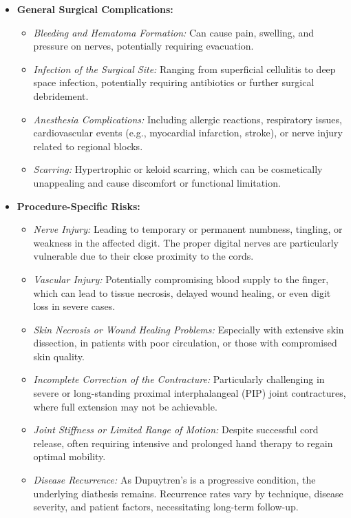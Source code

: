 \begin{itemize}
  \item \textbf{General Surgical Complications:}
  \begin{itemize}
    \item \textit{Bleeding and Hematoma Formation:} Can cause pain, swelling, and pressure on nerves, potentially requiring evacuation.
    \item \textit{Infection of the Surgical Site:} Ranging from superficial cellulitis to deep space infection, potentially requiring antibiotics or further surgical debridement.
    \item \textit{Anesthesia Complications:} Including allergic reactions, respiratory issues, cardiovascular events (e.g., myocardial infarction, stroke), or nerve injury related to regional blocks.
    \item \textit{Scarring:} Hypertrophic or keloid scarring, which can be cosmetically unappealing and cause discomfort or functional limitation.
  \end{itemize}
  \item \textbf{Procedure-Specific Risks:}
  \begin{itemize}
    \item \textit{Nerve Injury:} Leading to temporary or permanent numbness, tingling, or weakness in the affected digit. The proper digital nerves are particularly vulnerable due to their close proximity to the cords.
    \item \textit{Vascular Injury:} Potentially compromising blood supply to the finger, which can lead to tissue necrosis, delayed wound healing, or even digit loss in severe cases.
    \item \textit{Skin Necrosis or Wound Healing Problems:} Especially with extensive skin dissection, in patients with poor circulation, or those with compromised skin quality.
    \item \textit{Incomplete Correction of the Contracture:} Particularly challenging in severe or long-standing proximal interphalangeal (PIP) joint contractures, where full extension may not be achievable.
    \item \textit{Joint Stiffness or Limited Range of Motion:} Despite successful cord release, often requiring intensive and prolonged hand therapy to regain optimal mobility.
    \item \textit{Disease Recurrence:} As Dupuytren's is a progressive condition, the underlying diathesis remains. Recurrence rates vary by technique, disease severity, and patient factors, necessitating long-term follow-up.

\end{itemize}
\end{itemize}

